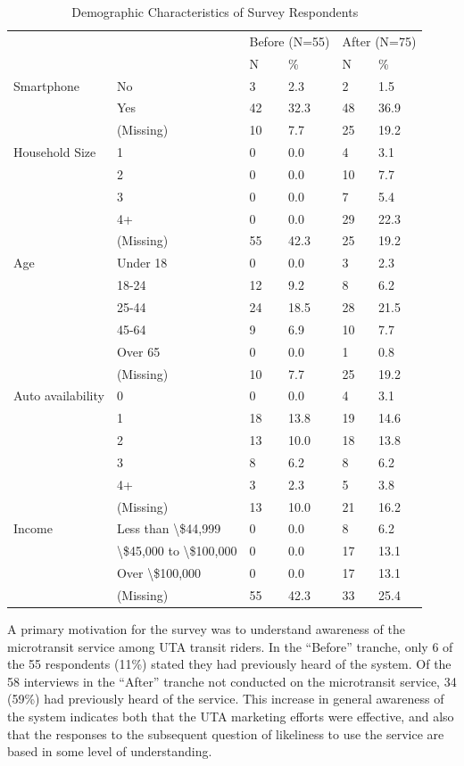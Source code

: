 \documentclass[smartcities,article,submit,moreauthors,pdftex]{mdpi}
\begin{document}
\begin{table}

\caption{\label{tab:survey-respondents}Demographic Characteristics of Survey Respondents}
\centering
\begin{tabular}[t]{llllll}
\toprule
\multicolumn{2}{c}{ } & \multicolumn{2}{c}{Before (N=55)} & \multicolumn{2}{c}{After (N=75)} \\
\cmidrule(l{3pt}r{3pt}){3-4} \cmidrule(l{3pt}r{3pt}){5-6}
  &    & N & \% & N  & \% \\
\midrule
Smartphone & No & 3 & 2.3 & 2 & 1.5\\
 & Yes & 42 & 32.3 & 48 & 36.9\\
 & (Missing) & 10 & 7.7 & 25 & 19.2\\
Household Size & 1 & 0 & 0.0 & 4 & 3.1\\
 & 2 & 0 & 0.0 & 10 & 7.7\\
 & 3 & 0 & 0.0 & 7 & 5.4\\
 & 4+ & 0 & 0.0 & 29 & 22.3\\
 & (Missing) & 55 & 42.3 & 25 & 19.2\\
Age & Under 18 & 0 & 0.0 & 3 & 2.3\\
 & 18-24 & 12 & 9.2 & 8 & 6.2\\
 & 25-44 & 24 & 18.5 & 28 & 21.5\\
 & 45-64 & 9 & 6.9 & 10 & 7.7\\
 & Over 65 & 0 & 0.0 & 1 & 0.8\\
 & (Missing) & 10 & 7.7 & 25 & 19.2\\
Auto availability & 0 & 0 & 0.0 & 4 & 3.1\\
 & 1 & 18 & 13.8 & 19 & 14.6\\
 & 2 & 13 & 10.0 & 18 & 13.8\\
 & 3 & 8 & 6.2 & 8 & 6.2\\
 & 4+ & 3 & 2.3 & 5 & 3.8\\
 & (Missing) & 13 & 10.0 & 21 & 16.2\\
Income & Less than \textbackslash{}\$44,999 & 0 & 0.0 & 8 & 6.2\\
 & \textbackslash{}\$45,000 to \textbackslash{}\$100,000 & 0 & 0.0 & 17 & 13.1\\
 & Over \textbackslash{}\$100,000 & 0 & 0.0 & 17 & 13.1\\
 & (Missing) & 55 & 42.3 & 33 & 25.4\\
\bottomrule
\end{tabular}
\end{table}

A primary motivation for the survey was to understand awareness of the
microtransit service among UTA transit riders. In the ``Before'' tranche, only 6
of the 55 respondents (11\%) stated they had previously heard of the system. Of
the 58 interviews in the ``After'' tranche not conducted on the microtransit
service, 34 (59\%) had previously heard of the service. This increase in general
awareness of the system indicates both that the UTA marketing efforts were
effective, and also that the responses to the subsequent question of likeliness
to use the service are based in some level of understanding.
\end{document}
